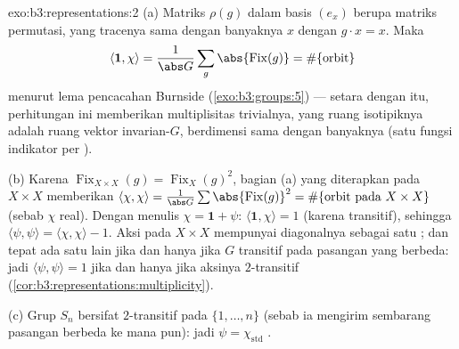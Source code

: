 \begin{solution}{exo:b3:representations:2}
(a) Matriks $\rho(g)$ dalam basis $(e_x)$ berupa
matriks permutasi, yang tracenya sama dengan banyaknya $x$ dengan $g\cdot x =
x$. Maka
\[
\langle\mathbf 1, \chi\rangle = \frac1{\abs G}\sum_g
\abs{\operatorname{Fix}(g)} = \#\{\text{orbit}\}
\]
menurut lema pencacahan Burnside (\cref{exo:b3:groups:5}) ---
setara dengan itu, perhitungan ini memberikan multiplisitas 
trivialnya, yang ruang isotipiknya adalah ruang vektor
invarian-$G$, berdimensi sama dengan banyaknya  (satu
fungsi indikator per ).

(b) Karena $\operatorname{Fix}_{X\times X}(g) =
\operatorname{Fix}_X(g)^2$, bagian (a) yang diterapkan pada $X \times X$
memberikan $\langle\chi,\chi\rangle = \frac1{\abs
G}\sum\abs{\operatorname{Fix}(g)}^2 = \#\{\text{orbit pada }
X\times X\}$ (sebab $\chi$ real). Dengan menulis $\chi = \mathbf 1 +
\psi$: $\langle\mathbf1,\chi\rangle = 1$ (karena transitif), sehingga
$\langle\psi,\psi\rangle = \langle\chi,\chi\rangle - 1$. Aksi
pada $X\times X$ mempunyai diagonalnya sebagai satu ; dan tepat
ada satu  lain jika dan hanya jika $G$ transitif pada pasangan yang berbeda:
jadi $\langle\psi,\psi\rangle = 1$ jika dan hanya jika aksinya $2$-transitif
(\cref{cor:b3:representations:multiplicity}).

(c) Grup $S_n$ bersifat $2$-transitif pada $\{1,\dots,n\}$ (sebab ia mengirim sembarang
pasangan berbeda ke mana pun): jadi $\psi = \chi_{\mathrm{std}}$
.
\end{solution}

